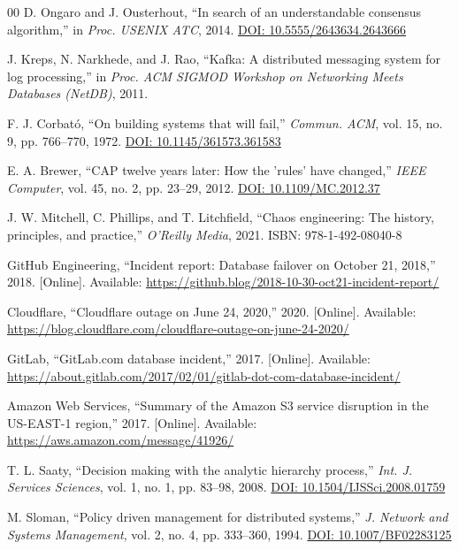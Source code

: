 \documentclass[conference]{IEEEtran}
\begin{document}
{\begin{thebibliography}{00}
D. Ongaro and J. Ousterhout, ``In search of an understandable consensus algorithm,'' in \textit{Proc. USENIX ATC}, 2014.
\href{https://doi.org/10.5555/2643634.2643666}{DOI: 10.5555/2643634.2643666}

J. Kreps, N. Narkhede, and J. Rao, ``Kafka: A distributed messaging system for log processing,'' in \textit{Proc. ACM SIGMOD Workshop on Networking Meets Databases (NetDB)}, 2011.

F. J. Corbat\'o, ``On building systems that will fail,'' \textit{Commun. ACM}, vol. 15, no. 9, pp. 766--770, 1972.
\href{https://doi.org/10.1145/361573.361583}{DOI: 10.1145/361573.361583}

E. A. Brewer, ``CAP twelve years later: How the 'rules' have changed,'' \textit{IEEE Computer}, vol. 45, no. 2, pp. 23--29, 2012.
\href{https://doi.org/10.1109/MC.2012.37}{DOI: 10.1109/MC.2012.37}

J. W. Mitchell, C. Phillips, and T. Litchfield, ``Chaos engineering: The history, principles, and practice,'' \textit{O'Reilly Media}, 2021.
ISBN: 978-1-492-08040-8

GitHub Engineering, ``Incident report: Database failover on October 21, 2018,'' 2018. [Online]. Available: \url{https://github.blog/2018-10-30-oct21-incident-report/}

Cloudflare, ``Cloudflare outage on June 24, 2020,'' 2020. [Online]. Available: \url{https://blog.cloudflare.com/cloudflare-outage-on-june-24-2020/}

GitLab, ``GitLab.com database incident,'' 2017. [Online]. Available: \url{https://about.gitlab.com/2017/02/01/gitlab-dot-com-database-incident/}

Amazon Web Services, ``Summary of the Amazon S3 service disruption in the US-EAST-1 region,'' 2017. [Online]. Available: \url{https://aws.amazon.com/message/41926/}

{\color{red}
T. L. Saaty, ``Decision making with the analytic hierarchy process,'' \textit{Int. J. Services Sciences}, vol. 1, no. 1, pp. 83--98, 2008.
\href{https://doi.org/10.1504/IJSSci.2008.01759}{DOI: 10.1504/IJSSci.2008.01759}

M. Sloman, ``Policy driven management for distributed systems,'' \textit{J. Network and Systems Management}, vol. 2, no. 4, pp. 333--360, 1994.
\href{https://doi.org/10.1007/BF02283125}{DOI: 10.1007/BF02283125}

}
\end{thebibliography}}
\end{document}
